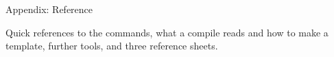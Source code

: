 
\begin{sectionframe}{Appendix: Reference}
	\begin{minipage}[t]{0.9\linewidth}\small
		Quick references to the commands, what a compile reads and how to make a template, further tools, and three reference sheets.
	\end{minipage}\par\medskip
	\SMChapterAgenda
\end{sectionframe}
